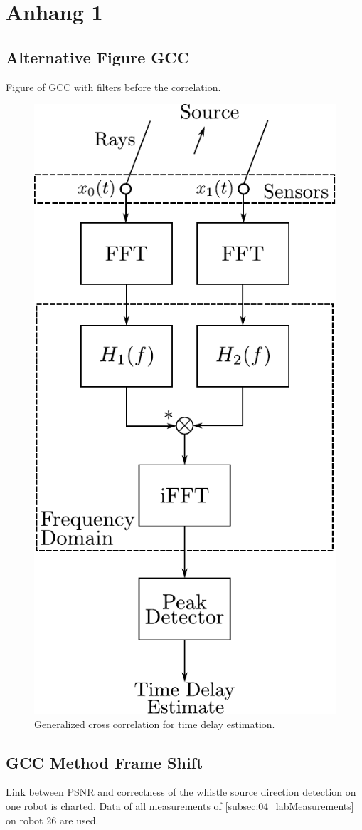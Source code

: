 \chapter{Anhang 1}
\label{chap:appendix1}

\section{Alternative Figure GCC}
\label{appendix:a1_alternativeGcc}

Figure of \ac{GCC} with filters before the correlation.
\begin{figure}[ht]
	\centering
		\includegraphics[width=0.35\columnwidth]{figures/GCC}
	\caption{Generalized cross correlation for time delay estimation.}
	\label{fig:ap1_GCC}
\end{figure}

\section{GCC Method Frame Shift}
\label{appendix:a1_gccFrameShift}

Link between \ac{PSNR} and correctness of the whistle source direction
detection on one robot is charted.
Data of all measurements of \cref{subsec:04_labMeasurements} on robot 26
are used.

